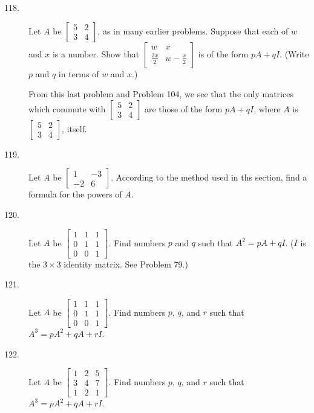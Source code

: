 \documentclass{article}
\begin{document}
\begin{description}
  \item[118.] Let $A$ be $\begin{bmatrix} 5 & 2 \\ 3 & 4 \end{bmatrix}$, as in many earlier problems. Suppose that each of $w$ and $x$ is a number. Show that $\begin{bmatrix} w & x \\ \frac{3x}{2} & w-\frac{x}{2} \end{bmatrix}$ is of the form $pA+qI$. (Write $p$ and $q$ in terms of $w$ and $x$.)

  \item[] From this last problem and Problem 104, we see that the only matrices which commute with $\begin{bmatrix} 5 & 2 \\ 3 & 4 \end{bmatrix}$ are those of the form $pA+qI$, where $A$ is $\begin{bmatrix} 5 & 2 \\ 3 & 4 \end{bmatrix}$, itself.

  \item[119.] Let $A$ be $\begin{bmatrix} 1 & -3 \\ -2 & 6 \end{bmatrix}$. According to the method used in ths section, find a formula for the powers of $A$.

  \item[120.] Let $A$ be $\begin{bmatrix} 1 & 1 & 1 \\ 0 & 1 & 1 \\ 0 & 0 & 1 \end{bmatrix}$. Find numbers $p$ and $q$ such that $A^2 = pA + qI$. ($I$ is the $3 \times 3$ identity matrix. See Problem 79.)

  \item[121.] Let $A$ be $\begin{bmatrix} 1 & 1 & 1 \\ 0 & 1 & 1 \\ 0 & 0 & 1 \end{bmatrix}$. Find numbers $p$, $q$, and $r$ such that $A^3 = pA^2 + qA + rI$.

  \item[122.] Let $A$ be $\begin{bmatrix} 1 & 2 & 5 \\ 3 & 4 & 7 \\ 1 & 2 & 1 \end{bmatrix}$. Find numbers $p$, $q$, and $r$ such that $A^3 = pA^2 + qA + rI$.


\end{description}
\end{document}
